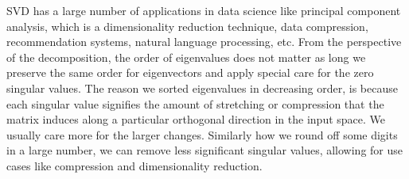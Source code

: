 SVD has a large number of applications in data science like principal component analysis, which is a dimensionality reduction technique, data compression, recommendation systems, natural language processing, etc. From the perspective of the decomposition, the order of eigenvalues does not matter as long we preserve the same order for eigenvectors and apply special care for the zero singular values. The reason we sorted eigenvalues in decreasing order, is because each singular value signifies the amount of stretching or compression that the matrix induces along a particular orthogonal direction in the input space. We usually care more for the larger changes. Similarly how we round off some digits in a large number, we can remove less significant singular values, allowing for use cases like compression and dimensionality reduction.
